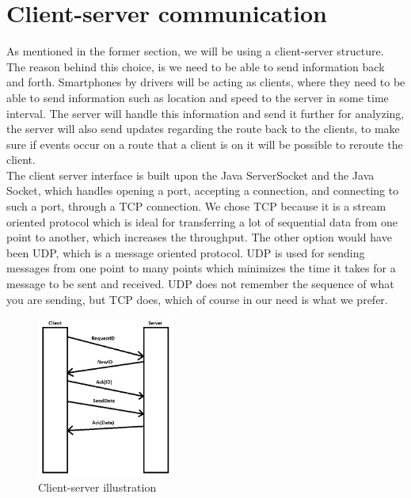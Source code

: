 \section{Client-server communication}
As mentioned in the former section, we will be using a client-server structure. The reason behind this choice, is we need to be able to send information back and forth. Smartphones by drivers will be acting as clients, where they need to be able to send information such as location and speed to the server in some time interval. The server will handle this information and send it further for analyzing, the server will also send updates regarding the route back to the clients, to make sure if events occur on a route that a client is on it will be possible to reroute the client.
\\
The client server interface is built upon the Java ServerSocket and the Java Socket, which handles opening a port, accepting a connection, and connecting to such a port, through a TCP connection. 
We chose TCP because it is a stream oriented protocol which is ideal for transferring a lot of sequential data from one point to another, which increases the throughput. The other option would have been UDP, which is a message oriented protocol. UDP is used for sending messages from one point to many points which minimizes the time it takes for a message to be sent and received. UDP does not remember the sequence of what you are sending, but TCP does, which of course in our need is what we prefer. 

\begin{figure}[h!]
  \centering
    \includegraphics[width=0.4\textwidth]{figures/clientserver.png}
    \caption{Client-server illustration}
    \label{fig:clientserver}
\end{figure}

